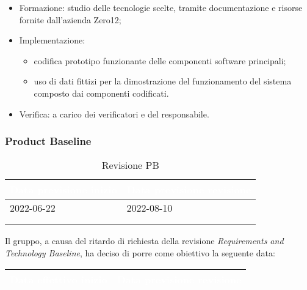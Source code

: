 {{\begin{itemize}
            \begin{itemize}
                \item Formazione: studio delle tecnologie scelte, tramite documentazione e risorse fornite dall'azienda Zero12;
                \item Implementazione: 
                    \begin{itemize}
                        \item codifica prototipo funzionante delle componenti software principali;
                        \item uso di dati fittizi per la dimostrazione del funzionamento del sistema composto dai componenti codificati.
                    \end{itemize}
                \item Verifica: a carico dei verificatori e del responsabile.
            \end{itemize}
    \end{itemize}
    
    \subsubsection{Product Baseline} {
        \setlength{\freewidth}{\dimexpr\textwidth-30\tabcolsep}
        \renewcommand{\arraystretch}{1.0}
        \setlength{\aboverulesep}{0pt}
        \setlength{\belowrulesep}{0pt}
        \begin{longtable}{C{.4\freewidth} C{.4\freewidth}}
        \toprule
        \textcolor{white}{\textbf{Data previsione inizio}}&
        \textcolor{white}{\textbf{Data previsione revisione}} \\
        \toprule
        \endhead
            
        2022-06-22 & 2022-08-10 \\
        \bottomrule
        \\
        \caption{Revisione PB}
        \end{longtable}
        Il gruppo, a causa del ritardo di richiesta della revisione \textit{Requirements and Technology Baseline}, ha deciso di 
        porre come obiettivo la seguente data: 
        \setlength{\freewidth}{\dimexpr\textwidth-30\tabcolsep}
        \renewcommand{\arraystretch}{1.0}
        \setlength{\aboverulesep}{0pt}
        \setlength{\belowrulesep}{0pt}
        \begin{longtable}{C{.4\freewidth} C{.4\freewidth}}
        \toprule
        \textcolor{white}{\textbf{Data effettivo inizio}}&
        \textcolor{white}{\textbf{Data previsione revisione}} \\
        \toprule
        \endhead
            

\end{longtable}}}}
